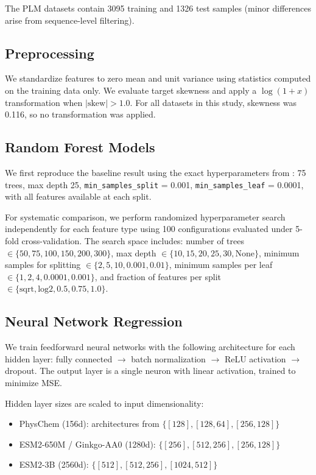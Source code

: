 \documentclass[12pt]{article}
\begin{document}
The PLM datasets contain 3095 training and 1326 test samples (minor differences arise from sequence-level filtering).

\subsection{Preprocessing}
\label{sec:preprocessing}

We standardize features to zero mean and unit variance using statistics computed on the training data only.
We evaluate target skewness and apply a $\log(1+x)$ transformation when $|\text{skew}| > 1.0$.
For all datasets in this study, skewness was 0.116, so no transformation was applied.

\subsection{Random Forest Models}
\label{sec:rf}

We first reproduce the baseline result using the exact hyperparameters from \citet{grasso2023}: 75 trees, max depth 25, \texttt{min\_samples\_split} = 0.001, \texttt{min\_samples\_leaf} = 0.0001, with all features available at each split.

For systematic comparison, we perform randomized hyperparameter search independently for each feature type using 100 configurations evaluated under 5-fold cross-validation.
The search space includes: number of trees $\in \{50, 75, 100, 150, 200, 300\}$, max depth $\in \{10, 15, 20, 25, 30, \text{None}\}$, minimum samples for splitting $\in \{2, 5, 10, 0.001, 0.01\}$, minimum samples per leaf $\in \{1, 2, 4, 0.0001, 0.001\}$, and fraction of features per split $\in \{\text{sqrt}, \text{log2}, 0.5, 0.75, 1.0\}$.

\subsection{Neural Network Regression}
\label{sec:nn}

We train feedforward neural networks with the following architecture for each hidden layer: fully connected $\rightarrow$ batch normalization $\rightarrow$ ReLU activation $\rightarrow$ dropout.
The output layer is a single neuron with linear activation, trained to minimize MSE.

Hidden layer sizes are scaled to input dimensionality:
\begin{itemize}
    \item PhysChem (156d): architectures from $\{[128], [128, 64], [256, 128]\}$
    \item ESM2-650M / Ginkgo-AA0 (1280d): $\{[256], [512, 256], [256, 128]\}$
    \item ESM2-3B (2560d): $\{[512], [512, 256], [1024, 512]\}$
\end{itemize}
\end{document}
